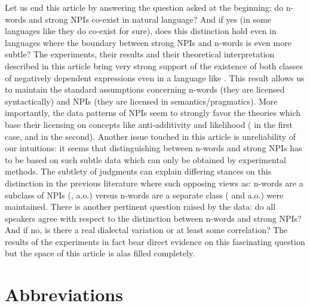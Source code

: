 \documentclass[output=paper, colorlinks, citecolor=brown, newtxmath]{langsci/langscibook}
\begin{document}
Let us end this article by answering the question asked at the beginning: do  n-words and strong NPIs co-exist in natural language? And if yes (in some languages like  they do co-exist for sure), does this distinction hold even in  languages where the boundary between strong NPIs and n-words is even more subtle? The experiments, their results and their theoretical interpretation described in this article bring very strong support of the existence of both classes of negatively dependent expressions even in a  language like . This result allows us to maintain the standard assumptions concerning n-words (they are licensed syntactically) and   NPIs (they are licensed in semantics/pragmatics). More importantly, the data patterns of  NPIs seem to strongly favor the  theories which base their licensing on concepts like  anti-additivity and likelihood (\citealt{zwarts1998three} in the first case, \citealt{heim1984note} and \citealt{crnivc2014against} in the second). Another issue touched in this article is unreliability of our intuitions: it seems that distinguishing between n-words and strong NPIs has to be based on such subtle data which can only be obtained by experimental methods. The subtlety of judgments can explain differing stances on this distinction in the previous literature where such opposing views as: n-words are a subclass of NPIs (\citealt{ladusaw1992expressing}, \citealt{fualuaus2016fragment} a.o.) versus n-words are a separate class (\citealt{zeijlstra2008negative} and \citealt{giannakidou2017landscape} a.o.) were maintained. There is another pertinent question raised by the data: do all speakers agree with respect to the distinction between n-words and strong NPIs? And if no, is there a real dialectal variation or at least some correlation? The results of the experiments in fact bear direct evidence on this fascinating question  but the space of this article is alas filled completely.

\section*{Abbreviations}
\end{document}
